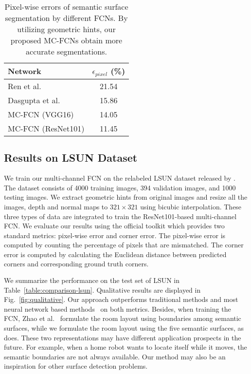 \begin{table}
	\centering
	\begin{tabular}{l|c} 
		\hline
		Network & $\epsilon_{pixel}$ (\%)\\
		\hline
		Ren et al.~\cite{ren2016coarse} & 21.54 \\
		Dasgupta et al.~\cite{dasgupta2016delay} & 15.86 \\  \hline
		MC-FCN (VGG16)  & 14.05 \\
		MC-FCN (ResNet101) & 11.45 \\
		\hline
	\end{tabular}
	\caption{Pixel-wise errors of semantic surface segmentation by different FCNs. By utilizing geometric hints, our proposed MC-FCNs obtain more accurate segmentations. }	
	\label{table:ablation}
\end{table}

\subsection{Results on LSUN Dataset}
\label{sec:LSUN}
We train our multi-channel FCN on the relabeled LSUN dataset released by \cite{ren2016coarse}. The dataset consists of 4000 training images, 394 validation images, and 1000 testing images. 
We extract geometric hints from original images and resize all the images, depth and normal maps to $321\times321$ using bicubic interpolation. 
These three types of data are integrated to train the ResNet101-based multi-channel FCN. 
We evaluate our results using the official toolkit which provides two standard metrics: pixel-wise error and corner error. The pixel-wise error is computed by counting the percentage of pixels that are mismatched. The corner error is computed by calculating the Euclidean distance between predicted corners and corresponding ground truth corners.

We summarize the performance on the test set of LSUN in Table~\ref{table:comparison-lsun}. Qualitative results are displayed in Fig.~\ref{fig:qualitative}. Our approach outperforms traditional methods \cite{hedau2009recovering} and most neural network based methods~\cite{mallya2015learning,zhang2017learning,dasgupta2016delay,ren2016coarse,LeeRoomNet17} on both metrics. 
%
Besides, when training the FCN, Zhao et al.~\cite{zhao2017physics} formulate the room layout using boundaries among semantic surfaces, while we formulate the room layout using the five semantic surfaces, as \cite{dasgupta2016delay} does. 
These two representations may have different application prospects in the future. For example, when a home robot wants to locate itself while it moves, the semantic boundaries are not always available. 
Our method may also be an inspiration for other surface detection problems.

